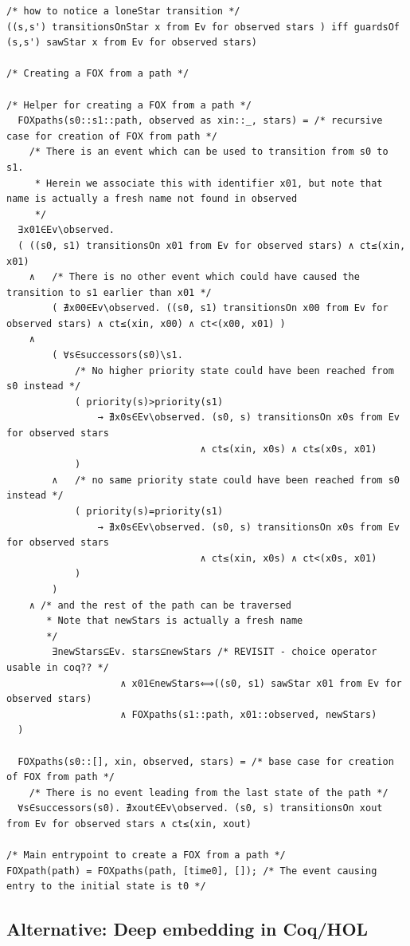 \documentclass[10pt]{paper}
\begin{document}
\begin{verbatim}
/* how to notice a loneStar transition */
((s,s') transitionsOnStar x from Ev for observed stars ) iff guardsOf (s,s') sawStar x from Ev for observed stars)

/* Creating a FOX from a path */

/* Helper for creating a FOX from a path */
  FOXpaths(s0::s1::path, observed as xin::_, stars) = /* recursive case for creation of FOX from path */
    /* There is an event which can be used to transition from s0 to s1.
     * Herein we associate this with identifier x01, but note that name is actually a fresh name not found in observed
     */
  ∃x01∈Ev\observed.
  ( ((s0, s1) transitionsOn x01 from Ev for observed stars) ∧ ct≤(xin, x01)
    ∧   /* There is no other event which could have caused the transition to s1 earlier than x01 */
        ( ∄x00∈Ev\observed. ((s0, s1) transitionsOn x00 from Ev for observed stars) ∧ ct≤(xin, x00) ∧ ct<(x00, x01) )
    ∧
        ( ∀s∈successors(s0)\s1.
            /* No higher priority state could have been reached from s0 instead */
            ( priority(s)>priority(s1)
                → ∄x0s∈Ev\observed. (s0, s) transitionsOn x0s from Ev for observed stars
                                  ∧ ct≤(xin, x0s) ∧ ct≤(x0s, x01)
            )
        ∧   /* no same priority state could have been reached from s0 instead */
            ( priority(s)=priority(s1)
                → ∄x0s∈Ev\observed. (s0, s) transitionsOn x0s from Ev for observed stars
                                  ∧ ct≤(xin, x0s) ∧ ct<(x0s, x01)
            )
        )
    ∧ /* and the rest of the path can be traversed 
       * Note that newStars is actually a fresh name
       */
        ∃newStars⊆Ev. stars⊆newStars /* REVISIT - choice operator usable in coq?? */
                    ∧ x01∈newStars⟺((s0, s1) sawStar x01 from Ev for observed stars)
                    ∧ FOXpaths(s1::path, x01::observed, newStars)
  )

  FOXpaths(s0::[], xin, observed, stars) = /* base case for creation of FOX from path */
    /* There is no event leading from the last state of the path */
  ∀s∈successors(s0). ∄xout∈Ev\observed. (s0, s) transitionsOn xout from Ev for observed stars ∧ ct≤(xin, xout)

/* Main entrypoint to create a FOX from a path */
FOXpath(path) = FOXpaths(path, [time0], []); /* The event causing entry to the initial state is t0 */
\end{verbatim}

\subsection{Alternative: Deep embedding in Coq/HOL}
\end{document}

